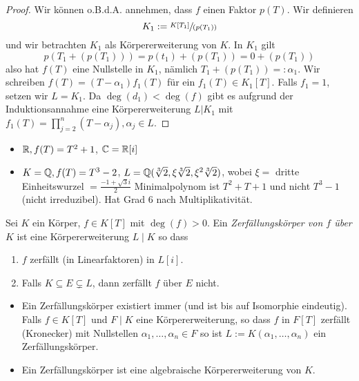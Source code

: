 \begin{proof}
	Wir können o.B.d.A. annehmen, dass $f$ %
	einen Faktor $p(T)$. Wir definieren
	\[
		K_1 := \sfrac{K[T_1]}{(p(T_1))}
	\]
	und wir betrachten $K_1$ als Körpererweiterung von $K$. In $K_1$ gilt
	\[
		p(T_1 + (p(T_1))) = p(t_1) + (p(T_1)) = 0 + (p(T_1))
	\] 
	also hat $f(T)$ eine Nullstelle in $K_1$, nämlich $T_1 + (p(T_1)) =: \alpha_1$.
	Wir schreiben $f(T) = (T-\alpha_1) f_1(T)$ für ein $f_1(T) \in K_1[T]$.
	Falls $f_1 = 1$, setzen wir $L = K_1$. Da $\deg(d_1) < \deg(f)$ gibt es aufgrund der Induktionsannahme eine Körpererweiterung $L | K_1$ mit
	$f_1(T) = \prod_{j=2}^{n} (T-\alpha_{j}), \alpha_{j} \in L$.
\end{proof}

\begin{eg}
	\begin{itemize}
		\item $\mathbb{R}, f(T) = T^2+1$, $\mathbb{C} = \mathbb{R}[i]$
		\item $K = \mathbb{Q}, f(T) = T^3 -2$, $L = \mathbb{Q}(\sqrt[3]{2}, \xi \sqrt[3]{2}, \xi^2 \sqrt[3]{2})$, wobei $\xi = $ dritte Einheitswurzel  $= \frac{-1+\sqrt{3} i}{2}$
			Minimalpolynom ist $T^2 + T + 1$ und nicht $T^3 -1$ (nicht irreduzibel).
			Hat Grad $6$ nach Multiplikativität.
	\end{itemize}
\end{eg}

\begin{definition}
	Sei $K$ ein Körper, $f \in K[T]$ mit $\deg(f) > 0$.
	Ein \emph{Zerfällungskörper von $f$ über $K$ } ist eine Körpererweiterung $L \mid K$ so dass
	\begin{enumerate}[1)]
		\item $f$ zerfällt (in Linearfaktoren) in $L[i]$.
		\item Falls $K \subseteq E \subsetneq L$, dann zerfällt $f$ über $E$ nicht.
	\end{enumerate}
\end{definition}

\begin{remark}
	\begin{itemize}
		\item Ein Zerfällungskörper existiert immer (und ist bis auf Isomorphie eindeutig).
			Falls $f \in K[T]$ und $F \mid K$ eine Körpererweiterung, so dass $f$ in $F[T]$ zerfällt (Kronecker)
			mit Nullstellen $\alpha_1,\ldots,\alpha_{n} \in F$ so ist $L := K(\alpha_1,\ldots,\alpha_{n})$ ein Zerfällungskörper.
		\item Ein Zerfällungskörper ist eine algebraische Körpererweiterung von $K$.
	\end{itemize}
\end{remark}

